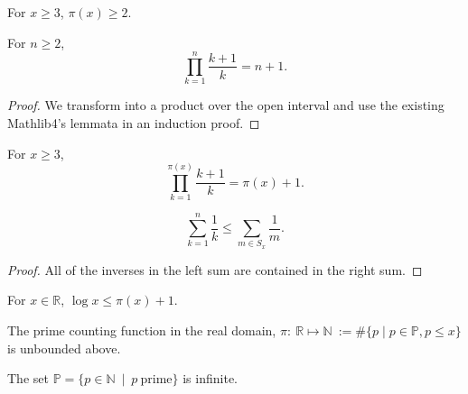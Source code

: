 \begin{lemma}
\label{lem:lemma5-2}
\leanok
For $x\ge3$, $\pi(x)\ge2$.
\end{lemma}

\begin{lemma}
\label{lem:lemma5-1}
\leanok
For $n\ge2$,
    $$\prod_{k=1}^{n}\frac{k+1}{k} = n+1.$$
\end{lemma}
\begin{proof}
\leanok
We transform into a product over the open interval and use the existing Mathlib4's lemmata in an induction proof.
\end{proof}

\begin{lemma}
\label{lem:lemma5}
\leanok
For $x\ge3$,
    $$\prod_{k=1}^{\pi(x)}\frac{k+1}{k} = \pi(x)+1.$$
\end{lemma}

\begin{lemma}
\label{lem:lemma1}
\leanok
{}
    $$\sum_{k=1}^n\frac1k \le \sum_{m\in S_x}\frac{1}{m}. $$
\end{lemma}
\begin{proof}
All of the inverses in the left sum are contained in the right sum.
\end{proof}


\begin{theorem}
\label{thm:log_le_primeCountingReal_add_one}
\leanok
For $x\in\mathbb{R}$, $\log x \le \pi(x) +1$.
\end{theorem}

\begin{theorem}
\label{thm:primeCountingReal_unbounded}
\leanok
The prime counting function in the real domain, $\pi:\ \mathbb{R} \mapsto \mathbb{N} \ := \#\big\{p\mid p \in\mathbb{P}, p\le x \big\}$ is unbounded above.
\end{theorem}

\begin{theorem}
\label{thm:infinite_primes}
\leanok
{}
The set $\mathbb{P} = \big\{p \in \mathbb{N} \ \mid \ p \ \mathrm{prime} \big\}$ is infinite. 
\end{theorem}

